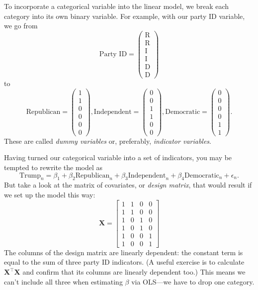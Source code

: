\documentclass[12pt,oneside,openany]{book}
\begin{document}
To incorporate a categorical variable into the linear model, we break
each category into its own binary variable. For example, with our party
ID variable, we go from \[
\text{Party ID} = \begin{pmatrix}
\text{R} \\
\text{R} \\
\text{I} \\
\text{I} \\
\text{D} \\
\text{D}
\end{pmatrix}
\] to \[
\text{Republican} = \begin{pmatrix} 1 \\ 1 \\ 0 \\ 0 \\ 0 \\ 0 \end{pmatrix},
\text{Independent} = \begin{pmatrix} 0 \\ 0 \\ 1 \\ 1 \\ 0 \\ 0 \end{pmatrix},
\text{Democratic} = \begin{pmatrix} 0 \\ 0 \\ 0 \\ 0 \\ 1 \\ 1 \end{pmatrix}.
\] These are called \emph{dummy variables} or, preferably,
\emph{indicator variables}.

Having turned our categorical variable into a set of indicators, you may
be tempted to rewrite the model as \[
\text{Trump}_n = \beta_1 + \beta_2 \text{Republican}_n + \beta_3 \text{Independent}_n + \beta_4 \text{Democratic}_n + \epsilon_n.
\] But take a look at the matrix of covariates, or \emph{design matrix},
that would result if we set up the model this way: \[
\mathbf{X} = \begin{bmatrix}
  1 & 1 & 0 & 0 \\
  1 & 1 & 0 & 0 \\
  1 & 0 & 1 & 0 \\
  1 & 0 & 1 & 0 \\
  1 & 0 & 0 & 1 \\
  1 & 0 & 0 & 1
\end{bmatrix}
\] The columns of the design matrix are linearly dependent: the constant
term is equal to the sum of three party ID indicators. (A useful
exercise is to calculate \(\mathbf{X}^\top \mathbf{X}\) and confirm that
its columns are linearly dependent too.) This means we can't include all
three when estimating \(\beta\) via OLS---we have to drop one category.
\end{document}
